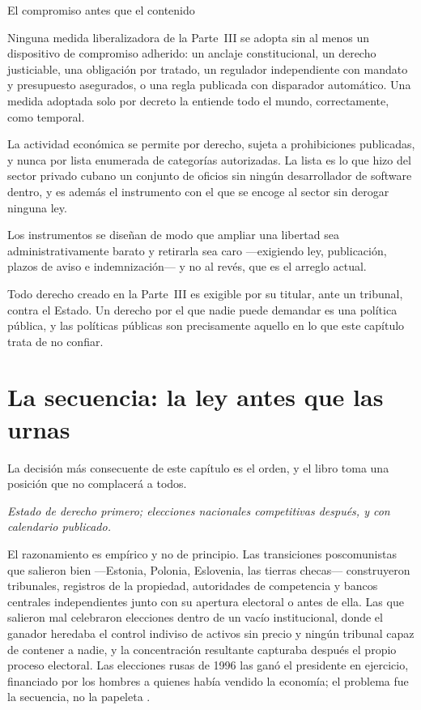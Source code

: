 \begin{design}{El compromiso antes que el contenido}
\label{d:commit}
\begin{rules}
 Ninguna medida liberalizadora de la Parte~III se adopta sin al menos
un dispositivo de compromiso adherido: un anclaje constitucional, un derecho
justiciable, una obligación por tratado, un regulador independiente con mandato y
presupuesto asegurados, o una regla publicada con disparador automático. Una medida
adoptada solo por decreto la entiende todo el mundo, correctamente, como temporal.

 La actividad económica se permite por derecho, sujeta a
prohibiciones publicadas, y nunca por lista enumerada de categorías autorizadas. La
lista es lo que hizo del sector privado cubano un conjunto de oficios sin ningún
desarrollador de software dentro, y es además el instrumento con el que se encoge
al sector sin derogar ninguna ley.

 Los instrumentos se diseñan de modo que ampliar una libertad sea
administrativamente barato y retirarla sea caro ---exigiendo ley, publicación,
plazos de aviso e indemnización--- y no al revés, que es el arreglo actual.

 Todo derecho creado en la Parte~III es exigible por su titular,
ante un tribunal, contra el Estado. Un derecho por el que nadie puede demandar es
una política pública, y las políticas públicas son precisamente aquello en lo que
este capítulo trata de no confiar.
\end{rules}
\end{design}

\section{La secuencia: la ley antes que las urnas}

La decisión más consecuente de este capítulo es el orden, y el libro toma una
posición que no complacerá a todos.

\emph{Estado de derecho primero; elecciones nacionales competitivas después, y con
calendario publicado.}

El razonamiento es empírico y no de principio. Las transiciones poscomunistas que
salieron bien ---Estonia, Polonia, Eslovenia, las tierras checas--- construyeron
tribunales, registros de la propiedad, autoridades de competencia y bancos centrales
independientes junto con su apertura electoral o antes de ella. Las que salieron mal
celebraron elecciones dentro de un vacío institucional, donde el ganador heredaba el
control indiviso de activos sin precio y ningún tribunal capaz de contener a nadie, y
la concentración resultante capturaba después el propio proceso electoral. Las
elecciones rusas de 1996 las ganó el presidente en ejercicio, financiado por los hombres a quienes
había vendido la economía; el problema fue la secuencia, no la papeleta
\citep{aslund2013}.

